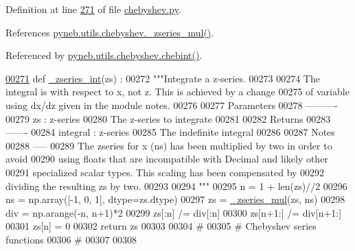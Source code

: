 Definition at line \hyperlink{chebyshev_8py_source_l00271}{271} of file \hyperlink{chebyshev_8py_source}{chebyshev.\+py}.



References \hyperlink{chebyshev_8py_source_l00148}{pyneb.\+utils.\+chebyshev.\+\_\+zseries\+\_\+mul()}.



Referenced by \hyperlink{chebyshev_8py_source_l00912}{pyneb.\+utils.\+chebyshev.\+chebint()}.


\begin{DoxyCode}
\hypertarget{namespacepyneb_1_1utils_1_1chebyshev_l00271}{}\hyperlink{namespacepyneb_1_1utils_1_1chebyshev_a39d3ae73408fcde399d87f5cfd5e7c98}{00271} \textcolor{keyword}{def }\hyperlink{namespacepyneb_1_1utils_1_1chebyshev_a39d3ae73408fcde399d87f5cfd5e7c98}{\_zseries\_int}(zs) :
00272     \textcolor{stringliteral}{"""Integrate a z-series.}
00273 \textcolor{stringliteral}{}
00274 \textcolor{stringliteral}{    The integral is with respect to x, not z. This is achieved by a change}
00275 \textcolor{stringliteral}{    of variable using dx/dz given in the module notes.}
00276 \textcolor{stringliteral}{}
00277 \textcolor{stringliteral}{    Parameters}
00278 \textcolor{stringliteral}{    ----------}
00279 \textcolor{stringliteral}{    zs : z-series}
00280 \textcolor{stringliteral}{        The z-series to integrate}
00281 \textcolor{stringliteral}{}
00282 \textcolor{stringliteral}{    Returns}
00283 \textcolor{stringliteral}{    -------}
00284 \textcolor{stringliteral}{    integral : z-series}
00285 \textcolor{stringliteral}{        The indefinite integral}
00286 \textcolor{stringliteral}{}
00287 \textcolor{stringliteral}{    Notes}
00288 \textcolor{stringliteral}{    -----}
00289 \textcolor{stringliteral}{    The zseries for x (ns) has been multiplied by two in order to avoid}
00290 \textcolor{stringliteral}{    using floats that are incompatible with Decimal and likely other}
00291 \textcolor{stringliteral}{    specialized scalar types. This scaling has been compensated by}
00292 \textcolor{stringliteral}{    dividing the resulting zs by two.}
00293 \textcolor{stringliteral}{}
00294 \textcolor{stringliteral}{    """}
00295     n = 1 + len(zs)//2
00296     ns = np.array([-1, 0, 1], dtype=zs.dtype)
00297     zs = \hyperlink{namespacepyneb_1_1utils_1_1chebyshev_a46d958933482afac66ea41d143155dae}{\_zseries\_mul}(zs, ns)
00298     div = np.arange(-n, n+1)*2
00299     zs[:n] /= div[:n]
00300     zs[n+1:] /= div[n+1:]
00301     zs[n] = 0
00302     \textcolor{keywordflow}{return} zs
00303 
00304 \textcolor{comment}{#}
00305 \textcolor{comment}{# Chebyshev series functions}
00306 \textcolor{comment}{#}
00307 
00308 
\end{DoxyCode}
\hypertarget{namespacepyneb_1_1utils_1_1chebyshev_a46d958933482afac66ea41d143155dae}{}
